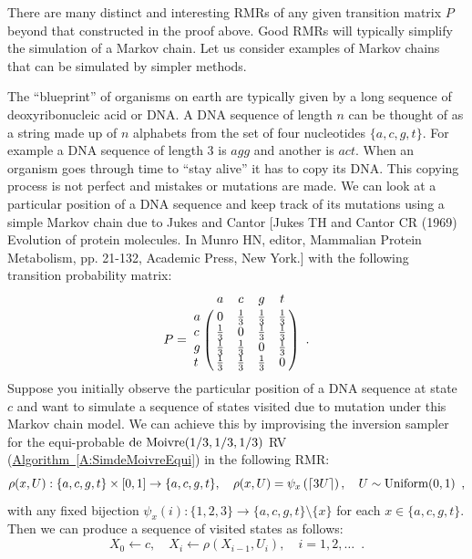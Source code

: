 There are many distinct and interesting RMRs of any given transition matrix $P$ beyond that constructed in the proof above.  Good RMRs will typically simplify the simulation of a Markov chain.
Let us consider examples of Markov chains that can be simulated by simpler methods.

\begin{example}  The ``blueprint'' of organisms on earth are typically given by a long sequence of deoxyribonucleic acid or DNA.  A DNA sequence of length $n$ can be thought of as a string made up of $n$ alphabets from the set of four nucleotides $\{a,c,g,t\}$.  For example a DNA sequence of length $3$ is $agg$ and another is $act$.  When an organism goes through time to ``stay alive'' it has to copy its DNA.  This copying process is not perfect and mistakes or mutations are made.  We can look at a particular position of a DNA sequence and keep track of its mutations using a simple Markov chain due to Jukes and Cantor [Jukes TH and Cantor CR (1969) Evolution of protein molecules. In Munro HN, editor, Mammalian Protein Metabolism, pp. 21-132, Academic Press, New York.] with the following transition probability matrix:
\[
P = 
\bordermatrix{~ & a & c & g & t \cr
a & 0 & \frac{1}{3} & \frac{1}{3} & \frac{1}{3} \cr
c & \frac{1}{3} & 0 & \frac{1}{3} & \frac{1}{3} \cr
g & \frac{1}{3} & \frac{1}{3} & 0 & \frac{1}{3} \cr
t & \frac{1}{3}  & \frac{1}{3} & \frac{1}{3} & 0} \enspace .
\]
Suppose you initially observe the particular position of a DNA sequence at state $c$ and want to simulate a sequence of states  visited due to mutation under this Markov chain model.   We can achieve this by improvising the inversion sampler for the equi-probable $\mbox{{\rm de~Moivre}}(1/3,1/3,1/3)$ RV (\hyperref[A:SimdeMoivreEqui]{Algorithm~\ref*{A:SimdeMoivreEqui}}) in the following RMR:
\[
\rho(x,U): \{a,c,g,t\} \times [0,1] \to \{a,c,g,t\}, \quad
\rho(x,U) = \psi_x \left( \lceil 3 U \rceil \right), \quad 
U \sim \mbox{{\rm Uniform}}(0,1) \enspace ,
\] 
with any fixed bijection $\psi_x(i) : \{1,2,3\} \to  \{a,c,g,t\} \setminus \{x\}$ for each $x \in \{a,c,g,t\}$.  
Then we can produce a sequence of visited states as follows:
\[
X_0 \gets c, \quad X_i \gets \rho\left( X_{i-1}, U_i \right), \quad i=1,2,\ldots \enspace .
\]
\end{example}

